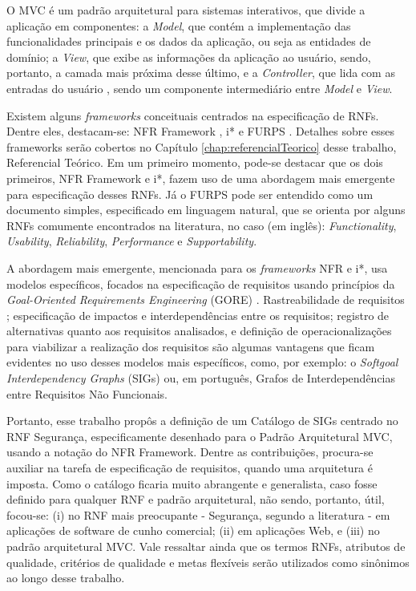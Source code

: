 O MVC é um padrão arquitetural para sistemas interativos, que divide a aplicação em componentes: a \textit{Model}, que contém a implementação das funcionalidades principais e os dados da aplicação, ou seja as entidades de domínio; a \textit{View}, que exibe as informações da aplicação ao usuário, sendo, portanto, a camada mais próxima desse último, e a \textit{Controller}, que lida com as entradas do usuário \cite{buschmann1996system}, sendo um componente intermediário entre \textit{Model} e \textit{View}.  

Existem alguns \textit{frameworks} conceituais centrados na especificação de RNFs. Dentre eles, destacam-se: NFR Framework \cite{chung2009non}, i* \cite{istarwiki20} e FURPS \cite{umar2011analyzing}. Detalhes sobre esses frameworks serão cobertos no Capítulo \ref{chap:referencialTeorico} desse trabalho, Referencial Teórico. Em um primeiro momento, pode-se destacar que os dois primeiros, NFR Framework e i*, fazem uso de uma abordagem mais emergente para especificação desses RNFs. Já o FURPS pode ser entendido como um documento simples, especificado em linguagem natural, que se orienta por alguns RNFs comumente encontrados na literatura, no caso (em inglês): \textit{Functionality}, \textit{Usability}, \textit{Reliability}, \textit{Performance} e \textit{Supportability}.

A abordagem mais emergente, mencionada para os \textit{frameworks} NFR e i*, usa modelos específicos, focados na especificação de requisitos usando princípios da \textit{Goal-Oriented Requirements Engineering} (GORE) \cite{horkoff2016goal}. Rastreabilidade de requisitos \cite{wiegers2013software}; especificação de impactos e interdependências entre os requisitos; registro de alternativas quanto aos requisitos analisados, e definição de operacionalizações para viabilizar a realização dos requisitos são algumas vantagens que ficam evidentes no uso desses modelos mais específicos, como, por exemplo: o \textit{Softgoal Interdependency Graphs} (SIGs) \cite{chung2012non} ou, em português, Grafos de Interdependências entre Requisitos Não Funcionais. 

Portanto, esse trabalho propôs a definição de um Catálogo de SIGs centrado no RNF Segurança, especificamente desenhado para o Padrão Arquitetural MVC, usando a notação do NFR Framework. Dentre as contribuições, procura-se auxiliar na tarefa de especificação de requisitos, quando uma arquitetura é imposta. Como o catálogo ficaria muito abrangente e generalista, caso fosse definido para qualquer RNF e padrão arquitetural, não sendo, portanto, útil, focou-se: (i) no RNF mais preocupante - Segurança, segundo a literatura - em aplicações de software de cunho comercial; (ii) em aplicações Web, e (iii) no padrão arquitetural MVC.  Vale ressaltar ainda que os termos RNFs, atributos de qualidade, critérios de qualidade e metas flexíveis serão utilizados como sinônimos ao longo desse trabalho.


